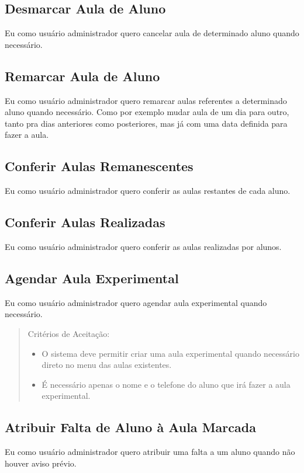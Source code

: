 \subsection[Desmarcar Aula de Aluno]{Desmarcar Aula de Aluno}
Eu como usuário administrador quero cancelar aula de determinado aluno quando
necessário.

\subsection[Remarcar Aula de Aluno]{Remarcar Aula de Aluno}
Eu como usuário administrador quero remarcar aulas referentes a determinado
aluno quando necessário. Como por exemplo mudar aula de um dia para outro,
tanto pra dias anteriores como posteriores, mas já com uma data definida
para fazer a aula.

\subsection[Conferir Aulas Remanescentes]{Conferir Aulas Remanescentes}
Eu como usuário administrador quero conferir as aulas restantes de cada aluno.

\subsection[Conferir Aulas Realizadas]{Conferir Aulas Realizadas}
Eu como usuário administrador quero conferir as aulas realizadas por alunos.

\subsection[Agendar Aula Experimental]{Agendar Aula Experimental}
Eu como usuário administrador quero agendar aula experimental quando necessário.

\begin{quote}
Critérios de Aceitação:
    \begin{itemize}
        \item O sistema deve permitir criar uma aula experimental quando necessário direto
        no menu das aulas existentes.
        \item É necessário apenas o nome e o telefone do aluno que irá fazer a aula
        experimental.
    \end{itemize}
\end{quote}

\subsection[Atribuir Falta de Aluno à Aula Marcada]{Atribuir Falta de Aluno à Aula Marcada}
Eu como usuário administrador quero atribuir uma falta a um aluno quando não
houver aviso prévio.

